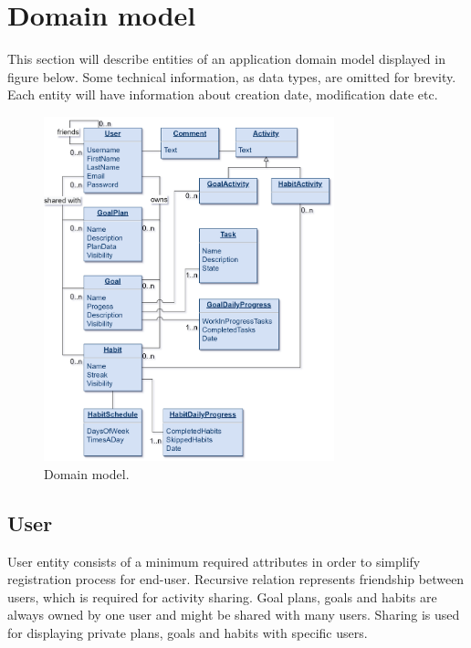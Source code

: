 
\section{Domain model}\label{sec:domain-model}

This section will describe entities of an application domain model displayed in figure below.
Some technical information, as data types, are omitted for brevity.
Each entity will have information about creation date, modification date etc.

\begin{figure}[h]
    \includegraphics[width=0.75\textwidth]{images/pda-domain-model.png}
    \caption{Domain model.}
    \label{fig:domain-model}
\end{figure}


\subsection{User}\label{subsec:user}

User entity consists of a minimum required attributes in order to simplify registration process for end-user.
Recursive relation represents friendship between users, which is required for activity sharing.
Goal plans, goals and habits are always owned by one user and might be shared with many users.
Sharing is used for displaying private plans, goals and habits with specific users.

